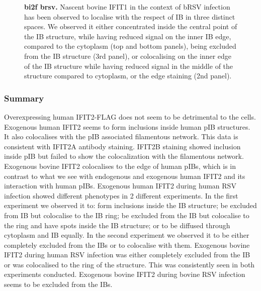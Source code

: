 \begin{figure}
\begin{subfigure}{1\textwidth}
    \end{subfigure}
    \caption[bi2f brsv]{\textbf{bi2f brsv.} Nascent bovine IFIT1 in the context of bRSV infection has been observed to localise with the respect of IB in three distinct spaces. We observed it either concentrated inside the central point of the IB structure, while having reduced signal on the inner IB edge, compared to the cytoplasm (top and bottom panels), being excluded from the IB structure (3rd panel), or colocalising on the inner edge of the IB structure while having reduced signal in the middle of the structure compared to cytoplasm, or the edge staining (2nd panel).}
    \label{fig:bi2f brsv}
\end{figure}

\subsubsection{Summary} \label{Summary-i2-flag}
Overexpressing human IFIT2-FLAG does not seem to be detrimental to the cells. Exogenous human IFIT2 seems to form inclusions inside human pIB structures. It also colocalises with the pIB associated filamentous network. This data is consistent with IFIT2A antibody staining. IFIT2B staining showed inclusion inside pIB but failed to show the colocalization with the filamentous network. Exogenous bovine IFIT2 colocalises to the edge of human pIBs, which is in contrast to what we see with endogenous and exogenous human IFIT2 and its interaction with human pIBs. Exogenous human IFIT2 during human RSV infection showed different phenotypes in 2 different experiments. In the first experiment we observed it to: form inclusions inside the IB structure; be excluded from IB but colocalise to the IB ring; be excluded from the IB but colocalise to the ring and have spots inside the IB structure; or to be diffused through cytoplasm and IB equally. In the second experiment we observed it to be either completely excluded from the IBs or to colocalise with them. Exogenous bovine IFIT2 during human RSV infection was either completely excluded from the IB or was colocalised to the ring of the structure. This was consistently seen in both experiments conducted. Exogenous bovine IFIT2 during bovine RSV infection seems to be excluded from the IBs.